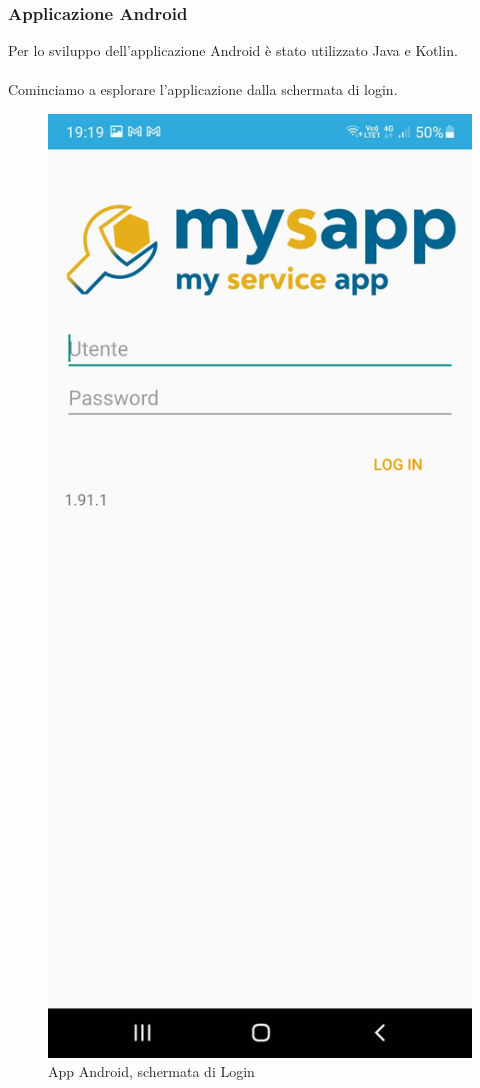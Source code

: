 \subsubsection{Applicazione Android}
Per lo sviluppo dell'applicazione Android è stato utilizzato Java e Kotlin.\\\\
Cominciamo a esplorare l'applicazione dalla schermata di login.\\
\begin{figure}[!h] 
	\centering 
	\includegraphics[scale = 0.2]{immagini/app Android/login-android.jpeg} 
	\caption {App Android, schermata di Login}
	\label{fig:2-18}
\end{figure}
